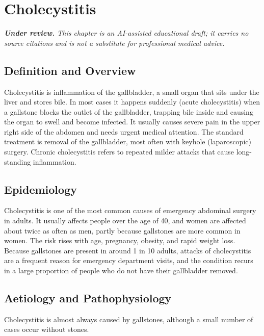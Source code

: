 \chapter{Cholecystitis}

\medskip
\noindent\textit{\textbf{Under review.} This chapter is an AI-assisted educational draft; it carries no source citations and is not a substitute for professional medical advice.}

\section*{Definition and Overview}
Cholecystitis is inflammation of the gallbladder, a small organ that sits under the liver and stores bile. In most cases it happens suddenly (acute cholecystitis) when a gallstone blocks the outlet of the gallbladder, trapping bile inside and causing the organ to swell and become infected. It usually causes severe pain in the upper right side of the abdomen and needs urgent medical attention. The standard treatment is removal of the gallbladder, most often with keyhole (laparoscopic) surgery. Chronic cholecystitis refers to repeated milder attacks that cause long-standing inflammation.

\section*{Epidemiology}
Cholecystitis is one of the most common causes of emergency abdominal surgery in adults. It usually affects people over the age of 40, and women are affected about twice as often as men, partly because gallstones are more common in women. The risk rises with age, pregnancy, obesity, and rapid weight loss. Because gallstones are present in around 1 in 10 adults, attacks of cholecystitis are a frequent reason for emergency department visits, and the condition recurs in a large proportion of people who do not have their gallbladder removed.

\section*{Aetiology and Pathophysiology}
Cholecystitis is almost always caused by gallstones, although a small number of cases occur without stones.

